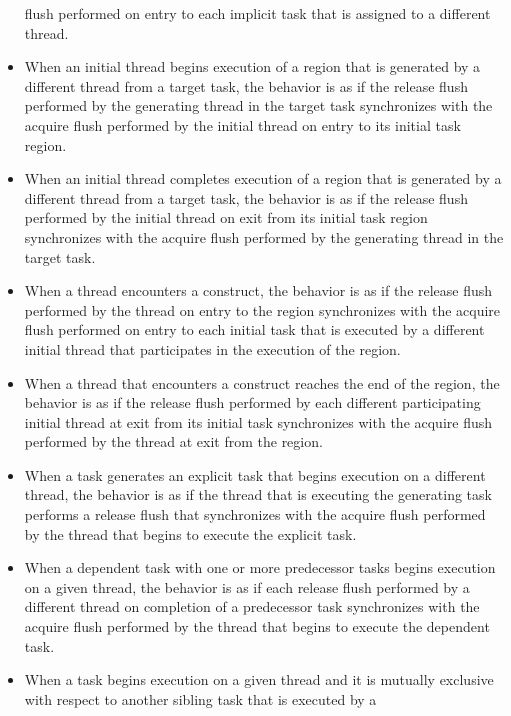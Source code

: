 \begin{itemize}
      flush performed on entry to each implicit task that is assigned to a
      different thread.
\item When an initial thread begins execution of a  region
      that is generated by a different thread from a target task, the
      behavior is as if the release flush performed by the generating thread
      in the target task synchronizes with the acquire flush performed by the
      initial thread on entry to its initial task region.
\item When an initial thread completes execution of a  region that is
      generated by a different thread from a target task, the behavior is as
      if the release flush performed by the initial thread on exit from its
      initial task region synchronizes with the acquire flush performed by
      the generating thread in the target task.
\item When a thread encounters a  construct, the behavior is as if the
      release flush performed by the thread on entry to the  region
      synchronizes with the acquire flush performed on entry to each initial
      task that is executed by a different initial thread that participates
      in the execution of the  region.
\item When a thread that encounters a  construct reaches the end
      of the  region, the behavior is as if the release flush
      performed by each different participating initial thread at exit from
      its initial task synchronizes with the acquire flush performed by the
      thread at exit from the  region.
\item When a task generates an explicit task that begins execution on a
      different thread, the behavior is as if the thread that is executing
      the generating task performs a release flush that synchronizes with
      the acquire flush performed by the thread that begins to execute the
      explicit task.
\item When a dependent task with one or more predecessor tasks begins
      execution on a given thread, the behavior is as if each release flush
      performed by a different thread on completion of a predecessor task
      synchronizes with the acquire flush performed by the thread that
      begins to execute the dependent task.
\item When a task begins execution on a given thread and it is mutually
      exclusive with respect to another sibling task that is executed by a

\end{itemize}
